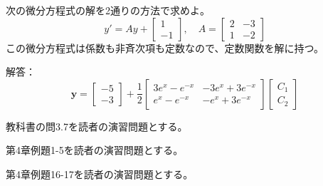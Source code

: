 \documentclass[report]{jlreq}
\begin{document}
\begin{problem}[小テスト8]
    次の微分方程式の解を2通りの方法で求めよ。
    \begin{equation}
        y' = Ay
        + \begin{bmatrix}
            1 \\
            -1
        \end{bmatrix},\quad
        A = \begin{bmatrix}
            2 & -3 \\
            1 & -2
        \end{bmatrix}
    \end{equation}
    この微分方程式は係数も非斉次項も定数なので、定数関数を解に持つ。

    解答：
    \begin{equation}
        \bm{y} = \begin{bmatrix}
            -5 \\
            -3
        \end{bmatrix}
        + \frac{1}{2} \begin{bmatrix}
            3 e^{x} - e^{-x} & -3 e^{x} + 3e^{-x} \\
            e^{x} - e^{-x} & -e^x + 3e^{-x}
        \end{bmatrix}
        \begin{bmatrix}
            C_1 \\
            C_2
        \end{bmatrix}
    \end{equation}
\end{problem}

\begin{problem}
    教科書の問3.7を読者の演習問題とする。
\end{problem}

\begin{problem}
    \cite{寺坂10} 第4章例題1-5を読者の演習問題とする。
\end{problem}
\begin{problem}
    \cite{寺坂10} 第4章例題16-17を読者の演習問題とする。
\end{problem}
\end{document}
